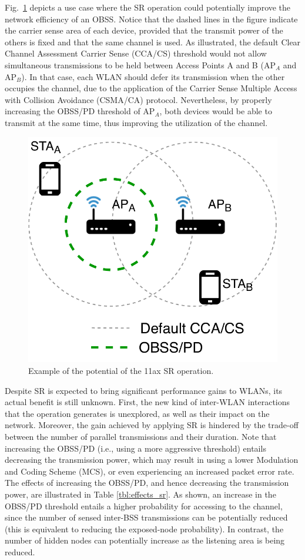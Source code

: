 \documentclass[conference]{IEEEtran}
\begin{document}
	Fig.~\ref{fig:example_sr} depicts a use case where the SR operation could potentially improve the network efficiency of an OBSS. Notice that the dashed lines in the figure indicate the carrier sense area of each device, provided that the transmit power of the others is fixed and that the same channel is used. As illustrated, the default Clear Channel Assessment Carrier Sense (CCA/CS) threshold would not allow simultaneous transmissions to be held between Access Points A and B (AP$_A$ and AP$_B$). In that case, each WLAN should defer its transmission when the other occupies the channel, due to the application of the Carrier Sense Multiple Access with Collision Avoidance (CSMA/CA) protocol. Nevertheless, by properly increasing the OBSS/PD threshold of AP$_A$, both devices would be able to transmit at the same time, thus improving the utilization of the channel.
	\begin{figure}[ht!]
		\centering
		\includegraphics[width=0.6\columnwidth]{fig_1}
		\caption{Example of the potential of the 11ax SR operation.}
		\label{fig:example_sr}
	\end{figure}
	
	Despite SR is expected to bring significant performance gains to WLANs, its actual benefit is still unknown. First, the new kind of inter-WLAN interactions that the operation generates is unexplored, as well as their impact on the network. Moreover, the gain achieved by applying SR is hindered by the trade-off between the number of parallel transmissions and their duration. Note that increasing the OBSS/PD (i.e., using a more aggressive threshold) entails decreasing the transmission power, which may result in using a lower Modulation and Coding Scheme (MCS), or even experiencing an increased packet  error rate. The effects of increasing the OBSS/PD, and hence decreasing the transmission power, are illustrated in Table \ref{tbl:effects_sr}. As shown, an increase in the OBSS/PD threshold entails a higher probability for accessing to the channel, since the number of sensed inter-BSS transmissions can be potentially reduced (this is equivalent to reducing the exposed-node probability). In contrast, the number of hidden nodes can potentially increase as the listening area is being reduced.
	
\end{document}
